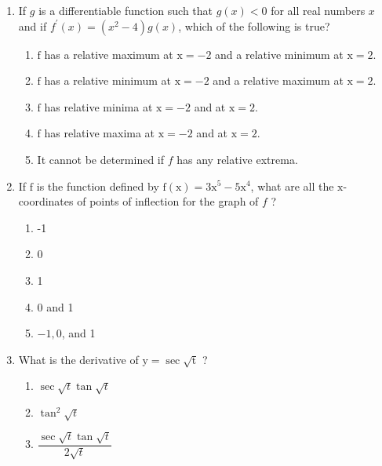 \documentclass{article}
\begin{document}
\begin{enumerate}
	\item
	\begin{minipage}[t]{\linewidth}
		If \(g\) is a differentiable function such that \(g(x)<0\) for all real
numbers \(x\) and if \(f^{\prime}(x)=\left(x^{2}-4\right) g(x)\), which
of the following is true?
\vspace{1em}
		\begin{enumerate}
		\itemsep1em
			\item \(\mathrm{f}\) has a relative maximum at \(\mathrm{x}=-2\) and a
relative minimum at \(\mathrm{x}=2\).
			\item \(\mathrm{f}\) has a relative minimum at \(\mathrm{x}=-2\) and a
relative maximum at \(\mathrm{x}=2\).
			\item \(\mathrm{f}\) has relative minima at \(\mathrm{x}=-2\) and at
\(\mathrm{x}=2\).
			\item \(\mathrm{f}\) has relative maxima at \(\mathrm{x}=-2\) and at
\(\mathrm{x}=2\).
			\item It cannot be determined if \(f\) has any relative extrema.
		\end{enumerate}
	\end{minipage}
	\item
	\begin{minipage}[t]{\linewidth}
		If \(\mathrm{f}\) is the function defined by
\(\mathrm{f}(\mathrm{x})=3 \mathrm{x}^{5}-5 \mathrm{x}^{4}\), what are
all the \(\mathrm{x}\)-coordinates of points of inflection for the graph
of \(f\) ?
\vspace{1em}
		\begin{enumerate}
		\itemsep1em
			\item -1
			\item 0
			\item 1
			\item 0 and 1
			\item \(-1,0\), and 1
		\end{enumerate}
	\end{minipage}
	\item
	\begin{minipage}[t]{\linewidth}
		What is the derivative of \(\mathrm{y}=\sec \sqrt{\mathrm{t}}\) ?
\vspace{1em}
		\begin{enumerate}
		\itemsep1em
			\item \(\sec \sqrt{t} \tan \sqrt{t}\)
			\item \(\tan ^{2} \sqrt{t}\)
			\item \(\dfrac{\sec \sqrt{t} \tan \sqrt{t}}{2 \sqrt{t}}\)

\end{enumerate}
\end{minipage}
\end{enumerate}
\end{document}
